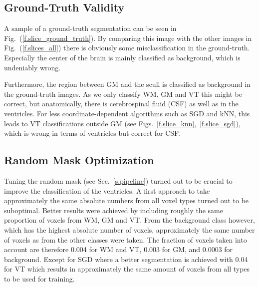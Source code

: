 \documentclass[journal]{IEEEtran}
\begin{document}
\subsection{Ground-Truth Validity}

A sample of a ground-truth segmentation can be seen in Fig.~(\ref{f.slice_ground_truth}). By comparing this image with the other images in Fig.~(\ref{f.slices_all}) there is obviously some misclassification in the ground-truth. Especially the center of the brain is mainly classified as background, which is undeniably wrong. 

Furthermore, the region between GM and the scull is classified as background in the ground-truth images. As we only classify WM, GM and VT this might be correct, but anatomically, there is cerebrospinal fluid (CSF) as well as in the ventricles. For less coordinate-dependent algorithms such as SGD and kNN, this leads to VT classifications outside GM (see Figs.~\ref{f.slice_knn},~\ref{f.slice_sgd}), which is wrong in terms of ventricles but correct for CSF.



\subsection{Random Mask Optimization}

Tuning the random mask (see Sec.~\ref{s.pipeline}) turned out to be crucial to improve the classification of the ventricles. A first approach to take approximately the same absolute numbers from all voxel types turned out to be suboptimal. Better results were achieved by including roughly the same proportion of voxels from WM, GM and VT. From the background class however, which has the highest absolute number of voxels, approximately the same number of voxels as from the other classes were taken. The fraction of voxels taken into account are therefore 0.004 for WM and VT, 0.003 for GM, and 0.0003 for background. Except for SGD where a better segmentation is achieved with 0.04 for VT which results in approximately the same amount of voxels from all types to be used for training.
\end{document}
